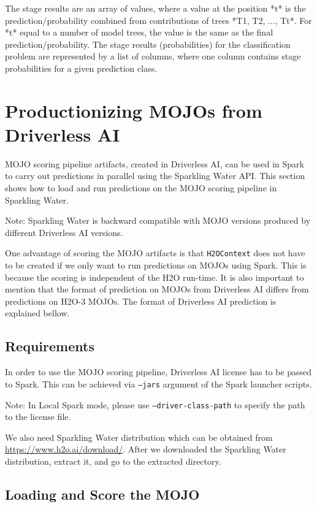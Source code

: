 The stage results are an array of values, where a value at the position *t* is the prediction/probability combined
from contributions of trees *T1, T2, ..., Tt*. For *t* equal to a number of model trees, the value is the same as the
final prediction/probability. The stage results (probabilities) for the classification problem
are represented by a list of columns, where one column contains stage probabilities for a given prediction class.

\section{Productionizing MOJOs from Driverless AI}

MOJO scoring pipeline artifacts, created in Driverless AI, can be used in Spark to carry out predictions in parallel
using the Sparkling Water API. This section shows how to load and run predictions on the MOJO scoring pipeline in
Sparkling Water.

Note: Sparkling Water is backward compatible with MOJO versions produced by different Driverless AI versions.

One advantage of scoring the MOJO artifacts is that \texttt{H2OContext} does not have to be created if we only want to
run predictions on MOJOs using Spark. This is because the scoring is independent of the H2O run-time. It is also
important to mention that the format of prediction on MOJOs from Driverless AI differs from predictions on H2O-3 MOJOs.
The format of Driverless AI prediction is explained bellow.

\subsection{Requirements}

In order to use the MOJO scoring pipeline, Driverless AI license has to be passed to Spark.
This can be achieved via \texttt{--jars} argument of the Spark launcher scripts.

Note: In Local Spark mode, please use \texttt{--driver-class-path} to specify the path to the license file.

We also need Sparkling Water distribution which can be obtained from \url{https://www.h2o.ai/download/}.
After we downloaded the Sparkling Water distribution, extract it, and go to the extracted directory.

\subsection{Loading and Score the MOJO}

